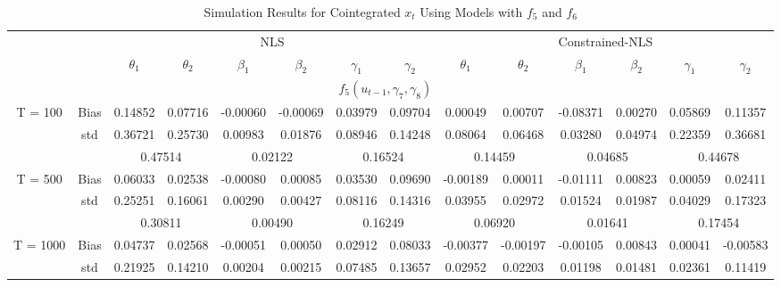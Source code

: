 \documentclass[a4paper,12pt,times,numbered,print,index]{report}
\numberwithin{equation}{section}
\begin{document}
\begin{table}[htbp]
  \centering
  \caption{Simulation Results for Cointegrated $x_t$ Using Models with $f_5$ and $f_6$}
    \begin{adjustbox}{max width=\textwidth}
    \begin{tabular}{cccccccccccccc}
    \toprule
          &       & \multicolumn{6}{c}{NLS}                       & \multicolumn{6}{c}{Constrained-NLS} \\
          &       & $\theta_1$ & $\theta_2$ & $\beta_1$ & $\beta_2$ & $\gamma_1$ & $\gamma_2$ & $\theta_1$ & $\theta_2$ & $\beta_1$ & $\beta_2$ & $\gamma_1$ & $\gamma_2$ \\
    \midrule
    &       & \multicolumn{10}{c}{$f_5 (u_{t-1},\gamma_7, \gamma_8)$}                \\
    \midrule
    \multirow{3}[1]{*}{T = 100} & Bias  & 0.14852 & 0.07716 & \textcolor[rgb]{ 0,  .439,  .753}{-0.00060} & -0.00069 & 0.03979 & 0.09704 & 0.00049 & 0.00707 & \textcolor[rgb]{ 0,  .439,  .753}{-0.08371} & 0.00270 & 0.05869 & 0.11357 \\
    & std   & 0.36721 & 0.25730 & 0.00983 & 0.01876 & 0.08946 & 0.14248 & 0.08064 & 0.06468 & 0.03280 & 0.04974 & 0.22359 & 0.36681 \\
    &       & \multicolumn{2}{c}{0.47514} & \multicolumn{2}{c}{0.02122} & \multicolumn{2}{c}{0.16524} & \multicolumn{2}{c}{0.14459} & \multicolumn{2}{c}{0.04685} & \multicolumn{2}{c}{0.44678} \\
    \multirow{3}[0]{*}{T = 500} & Bias  & 0.06033 & 0.02538 & \textcolor[rgb]{ 0,  .439,  .753}{-0.00080} & 0.00085 & 0.03530 & 0.09690 & -0.00189 & 0.00011 & \textcolor[rgb]{ 0,  .439,  .753}{-0.01111} & 0.00823 & 0.00059 & 0.02411 \\
    & std   & 0.25251 & 0.16061 & 0.00290 & 0.00427 & 0.08116 & 0.14316 & 0.03955 & 0.02972 & 0.01524 & 0.01987 & 0.04029 & 0.17323 \\
    &       & \multicolumn{2}{c}{0.30811} & \multicolumn{2}{c}{0.00490} & \multicolumn{2}{c}{0.16249} & \multicolumn{2}{c}{0.06920} & \multicolumn{2}{c}{0.01641} & \multicolumn{2}{c}{0.17454} \\
    \multirow{3}[1]{*}{T = 1000} & Bias  & 0.04737 & 0.02568 & \textcolor[rgb]{ 0,  .439,  .753}{-0.00051} & 0.00050 & 0.02912 & 0.08033 & -0.00377 & -0.00197 & \textcolor[rgb]{ 0,  .439,  .753}{-0.00105} & 0.00843 & 0.00041 & -0.00583 \\
          & std   & 0.21925 & 0.14210 & 0.00204 & 0.00215 & 0.07485 & 0.13657 & 0.02952 & 0.02203 & 0.01198 & 0.01481 & 0.02361 & 0.11419 \\

\end{tabular}
\end{adjustbox}
\end{table}
\end{document}
